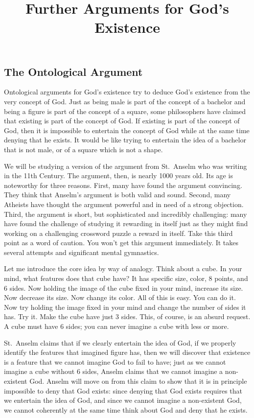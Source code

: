\documentclass[]{article}
\title{Further Arguments for God's Existence}
\date{}
\begin{document}
\maketitle

\subsection{The Ontological Argument}\label{the-ontological-argument}

Ontological arguments for God's existence try to deduce God's existence
from the very concept of God. Just as being male is part of the concept
of a bachelor and being a figure is part of the concept of a square,
some philosophers have claimed that existing is part of the concept of
God. If existing is part of the concept of God, then it is impossible to
entertain the concept of God while at the same time denying that he
exists. It would be like trying to entertain the idea of a bachelor that
is not male, or of a square which is not a shape.

We will be studying a version of the argument from St.~Anselm who was
writing in the 11th Century. The argument, then, is nearly 1000 years
old. Its age is noteworthy for three reasons. First, many have found the
argument convincing. They think that Anselm's argument is both valid and
sound. Second, many Atheists have thought the argument powerful and in
need of a strong objection. Third, the argument is short, but
sophisticated and incredibly challenging: many have found the challenge
of studying it rewarding in itself just as they might find working on a
challenging crossword puzzle a reward in itself. Take this third point
as a word of caution. You won't get this argument immediately. It takes
several attempts and significant mental gymnastics.

Let me introduce the core idea by way of analogy. Think about a cube. In
your mind, what features does that cube have? It has specific size,
color, 8 points, and 6 sides. Now holding the image of the cube fixed in
your mind, increase its size. Now decrease its size. Now change its
color. All of this is easy. You can do it. Now try holding the image
fixed in your mind and change the number of sides it has. Try it. Make
the cube have just 3 sides. This, of course, is an absurd request. A
cube must have 6 sides; you can never imagine a cube with less or more.

St.~Anselm claims that if we clearly entertain the idea of God, if we
properly identify the features that imagined figure has, then we will
discover that existence is a feature that we cannot imagine God to fail
to have; just as we cannot imagine a cube without 6 sides, Anselm claims
that we cannot imagine a non-existent God. Anselm will move on from this
claim to show that it is in principle impossible to deny that God
exists: since denying that God exists requires that we entertain the
idea of God, and since we cannot imagine a non-existent God, we cannot
coherently at the same time think about God and deny that he exists.
\end{document}
